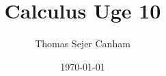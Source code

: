 \documentclass{article}
\title{Calculus Uge 10}
\author{Thomas Sejer Canham}
\date{\today}
\begin{document}
\begin{titlepage}
 \maketitle
 \thispagestyle{empty}
\end{titlepage}
\end{document}
